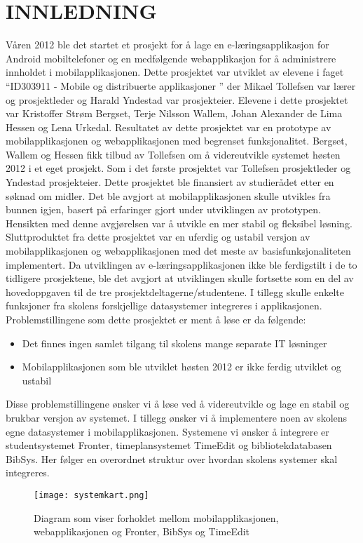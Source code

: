 \documentclass[../main.tex]{subfiles}
\begin{document}
\chapter{INNLEDNING}

Våren 2012 ble det startet et prosjekt for å lage en e-læringsapplikasjon for Android mobiltelefoner og en medfølgende webapplikasjon for å administrere innholdet i mobilapplikasjonen. Dette prosjektet var utviklet av elevene i faget “ID303911 - Mobile og distribuerte applikasjoner ” der Mikael Tollefsen var lærer og prosjektleder og Harald Yndestad var prosjekteier. Elevene i dette prosjektet var Kristoffer Strøm Bergset, Terje Nilsson Wallem, Johan Alexander de Lima Hessen og Lena Urkedal. Resultatet av dette prosjektet var en prototype av mobilapplikasjonen og webapplikasjonen med begrenset funksjonalitet.\newline
\newline
Bergset, Wallem og Hessen fikk tilbud av Tollefsen om å videreutvikle systemet høsten 2012 i et eget prosjekt. Som i det første prosjektet var Tollefsen prosjektleder og Yndestad prosjekteier. Dette prosjektet ble finansiert av studierådet etter en søknad om midler. Det ble avgjort at mobilapplikasjonen skulle utvikles fra bunnen igjen, basert på erfaringer gjort under utviklingen av prototypen. Hensikten med denne avgjørelsen var å utvikle en mer stabil og fleksibel løsning. Sluttproduktet fra dette prosjektet var en uferdig og ustabil versjon av mobilapplikasjonen og webapplikasjonen med det meste av basisfunksjonaliteten implementert.\newline
\newline
Da utviklingen av e-læringsapplikasjonen ikke ble ferdigstilt i de to tidligere prosjektene, ble det avgjort at utviklingen skulle fortsette som en del av hovedoppgaven til de tre prosjektdeltagerne/studentene. I tillegg skulle enkelte funksjoner fra skolens forskjellige datasystemer integreres i applikasjonen.\newline
Problemstillingene som dette prosjektet er ment å løse er da følgende:
\begin{itemize}
\item Det finnes ingen samlet tilgang til skolens mange separate IT løsninger
\item Mobilapplikasjonen som ble utviklet høsten 2012 er ikke ferdig utviklet og ustabil
\end{itemize}
Disse problemstillingene ønsker vi å løse ved å videreutvikle og lage en stabil og brukbar versjon av systemet. I tillegg ønsker vi å implementere noen av skolens egne datasystemer i mobilapplikasjonen. Systemene vi ønsker å integrere er studentsystemet Fronter, timeplansystemet TimeEdit og bibliotekdatabasen BibSys. Her følger en overordnet struktur over hvordan skolens systemer skal integreres.
\begin{figure}[H]
  \centering
  \texttt{[image: systemkart.png]}
  \caption{Diagram som viser forholdet mellom mobilapplikasjonen, webapplikasjonen og Fronter, BibSys og TimeEdit}
\end{figure}
\end{document}
